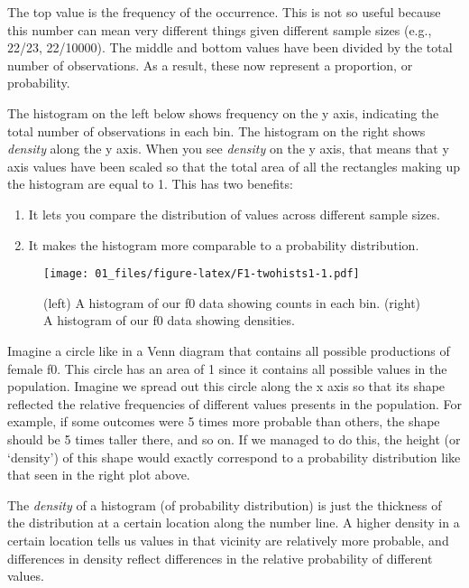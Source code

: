 \documentclass[
]{book}
\providecommand{\tightlist}{%
  \setlength{\itemsep}{0pt}\setlength{\parskip}{0pt}}
\begin{document}
The top value is the frequency of the occurrence. This is not so useful because this number can mean very different things given different sample sizes (e.g., 22/23, 22/10000). The middle and bottom values have been divided by the total number of observations. As a result, these now represent a proportion, or probability.

The histogram on the left below shows frequency on the y axis, indicating the total number of observations in each bin. The histogram on the right shows \emph{density} along the y axis. When you see \emph{density} on the y axis, that means that y axis values have been scaled so that the total area of all the rectangles making up the histogram are equal to 1. This has two benefits:

\begin{enumerate}
\def\labelenumi{\arabic{enumi})}
\tightlist
\item
  It lets you compare the distribution of values across different sample sizes.
\item
  It makes the histogram more comparable to a probability distribution.
\end{enumerate}

\begin{figure}
\centering
\texttt{[image: 01\_files/figure-latex/F1-twohists1-1.pdf]}
\caption{\label{fig:F1-twohists1}(left) A histogram of our f0 data showing counts in each bin. (right) A histogram of our f0 data showing densities.}
\end{figure}

Imagine a circle like in a Venn diagram that contains all possible productions of female f0. This circle has an area of 1 since it contains all possible values in the population. Imagine we spread out this circle along the x axis so that its shape reflected the relative frequencies of different values presents in the population. For example, if some outcomes were 5 times more probable than others, the shape should be 5 times taller there, and so on. If we managed to do this, the height (or `density') of this shape would exactly correspond to a probability distribution like that seen in the right plot above.

The \emph{density} of a histogram (of probability distribution) is just the thickness of the distribution at a certain location along the number line. A higher density in a certain location tells us values in that vicinity are relatively more probable, and differences in density reflect differences in the relative probability of different values.
\end{document}
